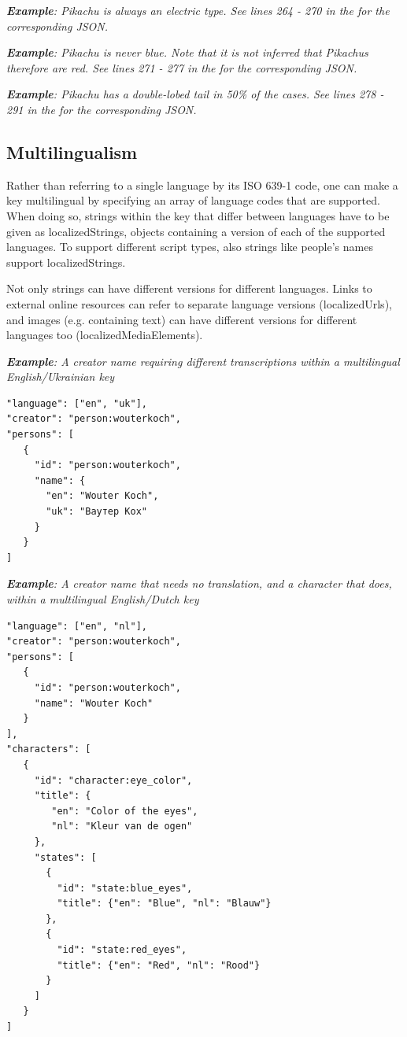 \documentclass[10pt,letterpaper]{article}
\begin{document}
\textit{\textbf{Example}: Pikachu is always an electric type. See lines 264 - 270 in the  for the corresponding JSON.}

\textit{\textbf{Example}: Pikachu is never blue. Note that it is not inferred that Pikachus therefore are red. See lines 271 - 277 in the  for the corresponding JSON.}

\textit{\textbf{Example}: Pikachu has a double-lobed tail in 50\% of the cases. See lines 278 - 291 in the  for the corresponding JSON.}
\subsection*{
Multilingualism
}
Rather than referring to a single language by its ISO 639-1 code, one can make a key multilingual by specifying an array of language codes that are supported. When doing so, strings within the key that differ between languages have to be given as localizedStrings, objects containing a version of each of the supported languages. To support different script types, also strings like people's names support localizedStrings.

Not only strings can have different versions for different languages. Links to external online resources can refer to separate language versions (localizedUrls), and images (e.g. containing text) can have different versions for different languages too (localizedMediaElements).

\textit{\textbf{Example}: A creator name requiring different transcriptions within a multilingual English/Ukrainian key}
\begin{verbatim}
"language": ["en", "uk"],
"creator": "person:wouterkoch",
"persons": [
   {
     "id": "person:wouterkoch",
     "name": {
       "en": "Wouter Koch",
       "uk": "Ваутер Кох"
     }
   }
]

\end{verbatim}

\textit{\textbf{Example}: A creator name that needs no translation, and a character that does, within a multilingual English/Dutch key}

\begin{verbatim}
"language": ["en", "nl"],
"creator": "person:wouterkoch",
"persons": [
   {
     "id": "person:wouterkoch",
     "name": "Wouter Koch"
   }
],
"characters": [
   {
     "id": "character:eye_color",
     "title": {
        "en": "Color of the eyes",
        "nl": "Kleur van de ogen"
     },
     "states": [
       {
         "id": "state:blue_eyes",
         "title": {"en": "Blue", "nl": "Blauw"}
       },
       {
         "id": "state:red_eyes",
         "title": {"en": "Red", "nl": "Rood"}
       }
     ]
   }
]

\end{verbatim}
\end{document}
